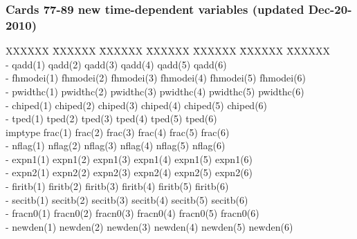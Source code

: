 \newpage \subsubsection{Cards 77-89 new time-dependent variables (updated Dec-20-2010)}
\begin{tabbing}
XXXXXX \= XXXXXX \= XXXXXX \= XXXXXX \= XXXXXX \= XXXXXX \=XXXXXX
      \\
- \> \footnotesize qadd(1) \>\footnotesize qadd(2) \>\footnotesize qadd(3) \>\footnotesize qadd(4)
\>\footnotesize qadd(5) \>\footnotesize qadd(6)\\
- \> \footnotesize fhmodei(1) \>\footnotesize fhmodei(2) \>\footnotesize fhmodei(3) \>\footnotesize fhmodei(4)
\>\footnotesize fhmodei(5) \>\footnotesize fhmodei(6)\\
- \> \footnotesize pwidthc(1) \>\footnotesize pwidthc(2) \>\footnotesize pwidthc(3) \>\footnotesize pwidthc(4)
\>\footnotesize pwidthc(5) \>\footnotesize pwidthc(6)\\
- \> \footnotesize chiped(1) \>\footnotesize chiped(2) \>\footnotesize chiped(3) \>\footnotesize chiped(4)
\>\footnotesize chiped(5) \>\footnotesize chiped(6)\\
- \> \footnotesize tped(1) \>\footnotesize tped(2) \>\footnotesize tped(3) \>\footnotesize tped(4)
\>\footnotesize tped(5) \>\footnotesize tped(6)\\
imptype \> \footnotesize frac(1) \>\footnotesize frac(2) \>\footnotesize frac(3) \>\footnotesize frac(4)
\>\footnotesize frac(5) \>\footnotesize frac(6)\\
- \> \footnotesize nflag(1) \>\footnotesize nflag(2) \>\footnotesize nflag(3) \>\footnotesize nflag(4)
\>\footnotesize nflag(5) \>\footnotesize nflag(6)\\
- \> \footnotesize expn1(1) \>\footnotesize expn1(2) \>\footnotesize expn1(3) \>\footnotesize expn1(4)
\>\footnotesize expn1(5) \>\footnotesize expn1(6)\\
- \> \footnotesize expn2(1) \>\footnotesize expn2(2) \>\footnotesize expn2(3) \>\footnotesize expn2(4)
\>\footnotesize expn2(5) \>\footnotesize expn2(6)\\
- \> \footnotesize firitb(1) \>\footnotesize firitb(2) \>\footnotesize firitb(3) \>\footnotesize firitb(4)
\>\footnotesize firitb(5) \>\footnotesize firitb(6)\\
- \> \footnotesize secitb(1) \>\footnotesize secitb(2) \>\footnotesize secitb(3) \>\footnotesize secitb(4)
\>\footnotesize secitb(5) \>\footnotesize secitb(6)\\
- \> \footnotesize fracn0(1) \>\footnotesize fracn0(2) \>\footnotesize fracn0(3) \>\footnotesize fracn0(4)
\>\footnotesize fracn0(5) \>\footnotesize fracn0(6)\\
- \> \footnotesize newden(1) \>\footnotesize newden(2) \>\footnotesize newden(3) \>\footnotesize newden(4)
\>\footnotesize newden(5) \>\footnotesize newden(6)\\
\end{tabbing} 
